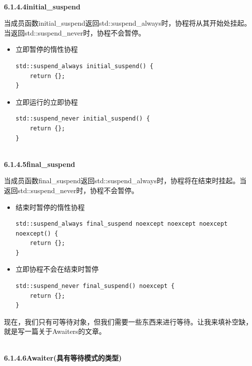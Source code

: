 \hspace*{\fill} \\ %
\noindent
\textbf{6.1.4.4\hspace{0.2cm}initial\_suspend}

当成员函数initial\_suspend返回std::suspend\_always时，协程将从其开始处挂起。当返回std::suspend\_never时，协程不会暂停。

\begin{itemize}
\item 
立即暂停的惰性协程

\begin{lstlisting}[style=styleCXX]
std::suspend_always initial_suspend() {
	return {};
}
\end{lstlisting}

\item 
立即运行的立即协程

\begin{lstlisting}[style=styleCXX]
std::suspend_never initial_suspend() {
	return {};
}
\end{lstlisting}
\end{itemize}


\hspace*{\fill} \\ %
\noindent
\textbf{6.1.4.5\hspace{0.2cm}final\_suspend}

当成员函数final\_suspend返回std::suspend\_always时，协程将在结束时挂起。当返回std::suspend\_never时，协程不会暂停。

\begin{itemize}
\item 
结束时暂停的惰性协程

\begin{lstlisting}[style=styleCXX]
std::suspend_always final_suspend noexcept noexcept noexcept noexcept() {
	return {};
}
\end{lstlisting}

\item 
立即协程不会在结束时暂停

\begin{lstlisting}[style=styleCXX]
std::suspend_never final_suspend() noexcept {
	return {};
}
\end{lstlisting}
\end{itemize}

现在，我们只有可等待对象，但我们需要一些东西来进行等待。让我来填补空缺，就是写一篇关于Awaiters的文章。

\hspace*{\fill} \\ %
\noindent
\textbf{6.1.4.6\hspace{0.2cm}Awaiter(具有等待模式的类型)}

